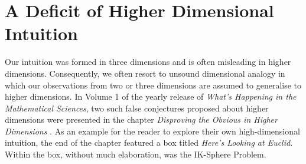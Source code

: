 \section{A Deficit of Higher Dimensional Intuition}
Our intuition was formed in three dimensions and is often misleading in higher dimensions. Consequently, we often resort to unsound dimensional analogy in which our observations from two or three dimensions are assumed to generalise to higher dimensions. In Volume 1 of the yearly release of \textit{What’s Happening in the Mathematical Sciences}, two such false conjectures proposed about higher dimensions were presented in the chapter \textit{Disproving the Obvious in Higher Dimensions} \cite{Cipra_1993}. As an example for the reader to explore their own high-dimensional intuition, the end of the chapter featured a box titled \textit{Here's Looking at Euclid}. Within the box, without much elaboration, was the IK-Sphere Problem.


